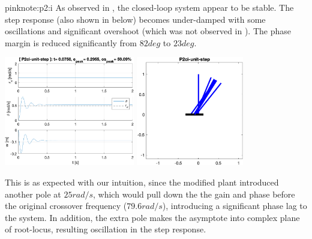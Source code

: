 \documentclass{tron}
\begin{document}
	\clearpage
	\begin{note}{pink}{note:p2:i}
		As observed in , the closed-loop system appear to be stable. The step response (also shown in  below) becomes under-damped with some oscillations and significant overshoot (which was not observed in ). The phase margin is reduced significantly from $82 \unit{deg}$ to $23 \unit{deg}$. 
		
		{	
			\centering
			\includegraphics[height=180px]{../matlab/output/q2/step_response_P2ci-unit-step} \qquad
			\includegraphics[height=180px]{../matlab/output/q2/sim_P2ci-unit-step}
		}			
		
		This is as expected with our intuition, since the modified plant introduced another pole at $25 \unit{rad/s}$, which would pull down the the gain and phase before the original crossover frequency ($79.6 \unit{rad/s}$), introducing a significant phase lag to the system. In addition, the extra pole makes the asymptote into complex plane of root-locus, resulting oscillation in the step response. 
	\end{note}
	
\end{document}
